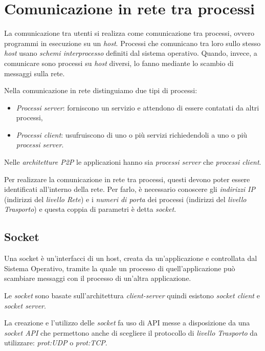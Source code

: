 \section{Comunicazione in rete tra processi}
La comunicazione tra utenti si realizza come comunicazione tra processi, ovvero
programmi in esecuzione su un \emph{host}. Processi che comunicano tra loro sullo
stesso \emph{host} usano \emph{schemi interprocesso} definiti dal sistema
operativo. Quando, invece, a comunicare sono processi su \emph{host} diversi, lo
fanno mediante lo scambio di messaggi sulla rete.

Nella comunicazione in rete distinguiamo due tipi di processi:
\begin{itemize}
    \item \emph{Processi server}: forniscono un servizio e attendono di essere
    contatati da altri processi,
    \item \emph{Processi client}: usufruiscono di uno o più servizi richiedendoli
    a uno o più \emph{processi server}.
\end{itemize}

\begin{note}
    Nelle \emph{architetture P2P} le applicazioni hanno sia \emph{processi
    server} che \emph{processi client}.
\end{note}\noindent
Per realizzare la comunicazione in rete tra processi, questi devono poter essere
identificati all'interno della rete. Per farlo, è necessario conoscere gli
\emph{indirizzi IP} (indirizzi del \emph{livello Rete}) e i \emph{numeri di porta} dei
processi (indirizzi del \emph{livello Trasporto}) e questa coppia di parametri è
detta \emph{socket}.

\subsection{Socket}
\begin{definition}[Socket]
    Una socket è un'interfacci di un host, creata da un'applicazione
    e controllata dal Sistema Operativo, tramite la quale un processo di
    quell'applicazione può scambiare messaggi con il processo di un'altra
    applicazione.
\end{definition}\noindent
Le \emph{socket} sono basate sull'architettura \emph{client-server} quindi
esistono \emph{socket client} e \emph{socket server}.

La creazione e l'utilizzo delle \emph{socket} fa uso di API messe a disposizione
da una \emph{socket API} che permettono anche di scegliere
il protocollo di \emph{livello Trasporto} da utilizzare: \emph{\gls{prot:UDP}}
o \emph{\gls{prot:TCP}}.


